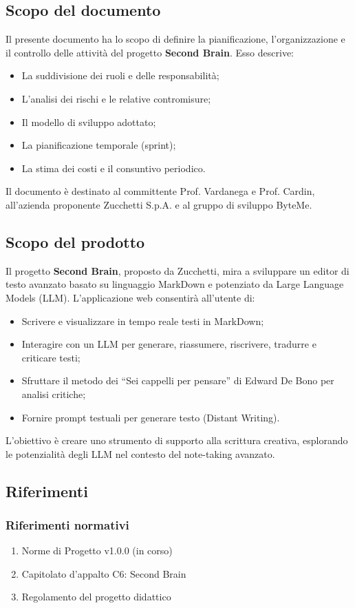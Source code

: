 \documentclass[11pt,a4paper]{article}
\begin{document}
\subsection{Scopo del documento}
Il presente documento ha lo scopo di definire la pianificazione, l’organizzazione e il controllo delle attività del progetto \textbf{Second Brain}. Esso descrive:
\begin{itemize}
    \item La suddivisione dei ruoli e delle responsabilità;
    \item L’analisi dei rischi e le relative contromisure;
    \item Il modello di sviluppo adottato;
    \item La pianificazione temporale (sprint);
    \item La stima dei costi e il consuntivo periodico.
\end{itemize}
Il documento è destinato al committente Prof. Vardanega e Prof. Cardin, all'azienda proponente Zucchetti S.p.A. e al gruppo di sviluppo ByteMe.

\subsection{Scopo del prodotto}
Il progetto \textbf{Second Brain}, proposto da Zucchetti, mira a sviluppare un editor di testo avanzato basato su linguaggio MarkDown e potenziato da Large Language Models (LLM). L’applicazione web consentirà all’utente di:
\begin{itemize}
    \item Scrivere e visualizzare in tempo reale testi in MarkDown;
    \item Interagire con un LLM per generare, riassumere, riscrivere, tradurre e criticare testi;
    \item Sfruttare il metodo dei “Sei cappelli per pensare” di Edward De Bono per analisi critiche;
    \item Fornire prompt testuali per generare testo (Distant Writing).
\end{itemize}
L’obiettivo è creare uno strumento di supporto alla scrittura creativa, esplorando le potenzialità degli LLM nel contesto del note-taking avanzato.

\subsection{Riferimenti}
\subsubsection{Riferimenti normativi}
\begin{enumerate}
    \item Norme di Progetto v1.0.0 (in corso)
    \item Capitolato d’appalto C6: Second Brain
    \item Regolamento del progetto didattico
\end{enumerate}
\end{document}

